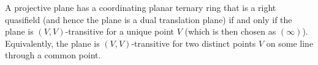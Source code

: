 A projective plane has a coordinating planar ternary ring that is a right quasifield (and hence the plane is a dual translation plane) if and only if the plane is $(V,V)$-transitive for a unique point $V$ (which is then chosen as $(\infty)$). Equivalently, the plane is $(V,V)$-transitive for two distinct points $V$ on some line through a common point.

